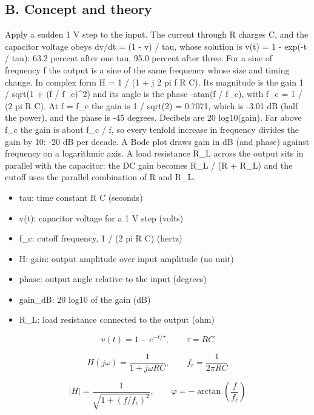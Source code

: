 \documentclass[11pt,a4paper]{article}
\begin{document}
\subsection*{B. Concept and theory}
Apply a sudden 1 V step to the input. The current through R charges C, and the capacitor voltage obeys dv/dt = (1 - v) / tau, whose solution is v(t) = 1 - exp(-t / tau): 63.2 percent after one tau, 95.0 percent after three. For a sine of frequency f the output is a sine of the same frequency whose size and timing change. In complex form H = 1 / (1 + j 2 pi f R C). Its magnitude is the gain 1 / sqrt(1 + (f / f\_c)\textasciicircum{}2) and its angle is the phase -atan(f / f\_c), with f\_c = 1 / (2 pi R C). At f = f\_c the gain is 1 / sqrt(2) = 0.7071, which is -3.01 dB (half the power), and the phase is -45 degrees. Decibels are 20 log10(gain). Far above f\_c the gain is about f\_c / f, so every tenfold increase in frequency divides the gain by 10: -20 dB per decade. A Bode plot draws gain in dB (and phase) against frequency on a logarithmic axis. A load resistance R\_L across the output sits in parallel with the capacitor: the DC gain becomes R\_L / (R + R\_L) and the cutoff uses the parallel combination of R and R\_L.

\begin{itemize}[nosep]
\item tau: time constant R C (seconds)
\item v(t): capacitor voltage for a 1 V step (volts)
\item f\_c: cutoff frequency, 1 / (2 pi R C) (hertz)
\item \textbar{}H\textbar{}: gain: output amplitude over input amplitude (no unit)
\item phase: output angle relative to the input (degrees)
\item gain\_dB: 20 log10 of the gain (dB)
\item R\_L: load resistance connected to the output (ohm)
\end{itemize}

\begin{equation*}
v(t)=1-e^{-t/\tau},\qquad \tau=RC
\end{equation*}

\begin{equation*}
H(j\omega)=\frac{1}{1+j\omega RC},\qquad f_c=\frac{1}{2\pi RC}
\end{equation*}

\begin{equation*}
|H|=\frac{1}{\sqrt{1+(f/f_c)^2}},\qquad \varphi=-\arctan\!\left(\frac{f}{f_c}\right)
\end{equation*}
\end{document}
